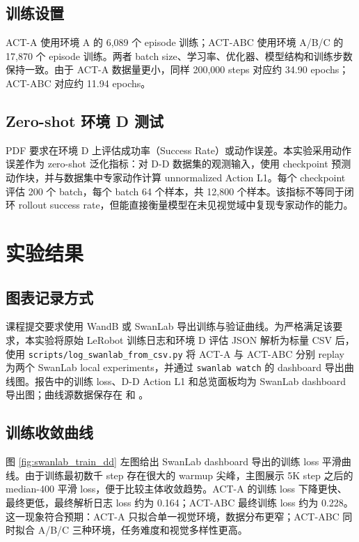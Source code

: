\documentclass[11pt,a4paper]{ctexart}
\begin{document}
\subsection{训练设置}
ACT-A 使用环境 A 的 6,089 个 episode 训练；ACT-ABC 使用环境 A/B/C 的 17,870 个 episode 训练。两者 batch size、学习率、优化器、模型结构和训练步数保持一致。由于 ACT-A 数据量更小，同样 200,000 steps 对应约 34.90 epochs；ACT-ABC 对应约 11.94 epochs。

\subsection{Zero-shot 环境 D 测试}
PDF 要求在环境 D 上评估成功率（Success Rate）或动作误差。本实验采用动作误差作为 zero-shot 泛化指标：对 D-D 数据集的观测输入，使用 checkpoint 预测动作块，并与数据集中专家动作计算 unnormalized Action L1。每个 checkpoint 评估 200 个 batch，每个 batch 64 个样本，共 12,800 个样本。该指标不等同于闭环 rollout success rate，但能直接衡量模型在未见视觉域中复现专家动作的能力。

\section{实验结果}
\subsection{图表记录方式}
课程提交要求使用 WandB 或 SwanLab 导出训练与验证曲线。为严格满足该要求，本实验将原始 LeRobot 训练日志和环境 D 评估 JSON 解析为标量 CSV 后，使用 \texttt{scripts/log\_swanlab\_from\_csv.py} 将 ACT-A 与 ACT-ABC 分别 replay 为两个 SwanLab local experiments，并通过 \texttt{swanlab watch} 的 dashboard 导出曲线图。报告中的训练 loss、D-D Action L1 和总览面板均为 SwanLab dashboard 导出图；曲线源数据保存在  和 。

\subsection{训练收敛曲线}
图 \ref{fig:swanlab_train_dd} 左图给出 SwanLab dashboard 导出的训练 loss 平滑曲线。由于训练最初数千 step 存在很大的 warmup 尖峰，主图展示 5K step 之后的 median-400 平滑 loss，便于比较主体收敛趋势。ACT-A 的训练 loss 下降更快、最终更低，最终解析日志 loss 约为 0.164；ACT-ABC 最终训练 loss 约为 0.228。这一现象符合预期：ACT-A 只拟合单一视觉环境，数据分布更窄；ACT-ABC 同时拟合 A/B/C 三种环境，任务难度和视觉多样性更高。
\end{document}
